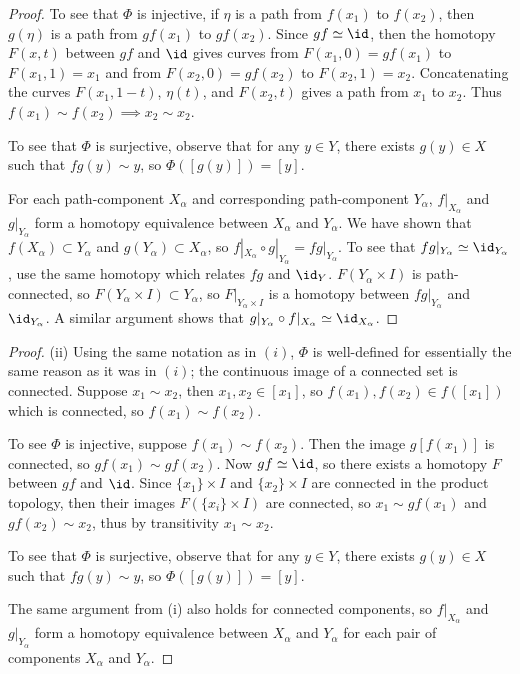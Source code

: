 \documentclass[12pt,letterpaper]{article}
\begin{document}
\begin{enumerate}
\begin{proof}
To see that $\Phi$ is injective, if $\eta$ is a path from $f(x_1)$ to $f(x_2)$, then $g(\eta)$ is a path from $g f(x_1)$ to $g f(x_2)$. Since $gf\simeq\id$, then the homotopy $F(x,t)$ between $gf$ and $\id$ gives curves from $F(x_1,0)=gf(x_1)$ to $F(x_1,1)=x_1$ and from $F(x_2,0)=gf(x_2)$ to $F(x_2,1)=x_2$. Concatenating the curves $F(x_1, 1-t)$, $\eta(t)$, and $F(x_2, t)$ gives a path from $x_1$ to $x_2$. Thus $f(x_1)\sim f(x_2) \implies x_2\sim x_2$. 

To see that $\Phi$ is surjective, observe that for any $y\in Y$, there exists $g(y)\in X$ such that $fg(y)\sim y$, so $\Phi([g(y)])=[y]$.  

For each path-component $X_\alpha$ and corresponding path-component $Y_\alpha$, $f|_{X_\alpha}$ and $g|_{Y_\alpha}$ form a homotopy equivalence between $X_\alpha$ and $Y_\alpha$. We have shown that $f(X_\alpha)\subset Y_\alpha$ and $g(Y_\alpha)\subset X_\alpha$, so $f|_{X_\alpha}\circ g|_{Y_\alpha}=fg|_{Y_\alpha}$. To see that $fg|_{Y_\alpha}\simeq\id_{Y_\alpha}$, use the same homotopy which relates $fg$ and $\id_Y$. $F(Y_\alpha\times I)$ is path-connected, so $F(Y_\alpha\times I)\subset Y_\alpha$, so $F|_{Y_\alpha\times I}$ is a homotopy between $fg|_{Y_\alpha}$ and $\id_{Y_\alpha}$. A similar argument shows that $g|_{Y_\alpha}\circ f|_{X_\alpha}\simeq\id_{X_\alpha}$. 
\qedwhite \let\qed\relax
\end{proof}

\begin{proof}(ii)
Using the same notation as in $(i)$, $\Phi$ is well-defined for essentially the same reason as it was in $(i)$; the continuous image of a connected set is connected. Suppose $x_1\sim x_2$, then $x_1,x_2\in[x_1]$, so $f(x_1),f(x_2)\in f([x_1])$ which is connected, so $f(x_1)\sim f(x_2)$. 

To see $\Phi$ is injective, suppose $f(x_1)\sim f(x_2)$. Then the image $g[f(x_1)]$ is connected, so $gf(x_1)\sim gf(x_2)$. Now $gf\simeq\id$, so there exists a homotopy $F$ between $gf$ and $\id$. Since $\{x_1\}\times I$ and $\{x_2\}\times I$ are connected in the product topology, then their images $F(\{x_i\}\times I)$ are connected, so $x_1 \sim gf(x_1)$ and $gf(x_2)\sim x_2$, thus by transitivity $x_1\sim x_2$. 

To see that $\Phi$ is surjective, observe that for any $y\in Y$, there exists $g(y)\in X$ such that $fg(y)\sim y$, so $\Phi([g(y)])=[y]$.  

The same argument from (i) also holds for connected components, so $f|_{X_\alpha}$ and $g|_{Y_\alpha}$ form a homotopy equivalence between $X_\alpha$ and $Y_\alpha$ for each pair of components $X_\alpha$ and $Y_\alpha$. \qedwhite \let\qed\relax
\end{proof}


\end{enumerate}
\end{document}
